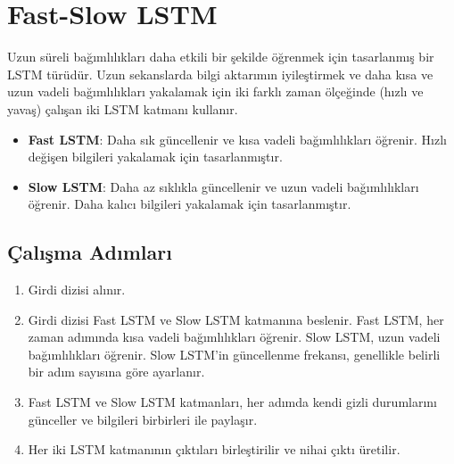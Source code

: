 \section{Fast-Slow LSTM}
Uzun süreli bağımlılıkları daha etkili bir şekilde öğrenmek için tasarlanmış bir LSTM türüdür. Uzun sekanslarda bilgi aktarımın iyileştirmek ve daha kısa ve uzun vadeli bağımlılıkları yakalamak için iki farklı zaman ölçeğinde (hızlı ve yavaş) çalışan iki LSTM katmanı kullanır.

\begin{itemize}
	\item \textbf{Fast LSTM}: Daha sık güncellenir ve kısa vadeli bağımlılıkları öğrenir. Hızlı değişen bilgileri yakalamak için tasarlanmıştır.
	\item \textbf{Slow LSTM}: Daha az sıklıkla güncellenir ve uzun vadeli bağımlılıkları öğrenir. Daha kalıcı bilgileri yakalamak için tasarlanmıştır.
\end{itemize}

\subsection{Çalışma Adımları}
\begin{enumerate}
	\item Girdi dizisi alınır.
	\item Girdi dizisi Fast LSTM ve Slow LSTM katmanına beslenir. Fast LSTM, her zaman adımında kısa vadeli bağımlılıkları öğrenir. Slow LSTM, uzun vadeli bağımlılıkları öğrenir. Slow LSTM'in güncellenme frekansı, genellikle belirli bir adım sayısına göre ayarlanır.
	\item Fast LSTM ve Slow LSTM katmanları, her adımda kendi gizli durumlarını günceller ve bilgileri birbirleri ile paylaşır. 
	\item Her iki LSTM katmanının çıktıları birleştirilir ve nihai çıktı üretilir.
\end{enumerate}

\newpage